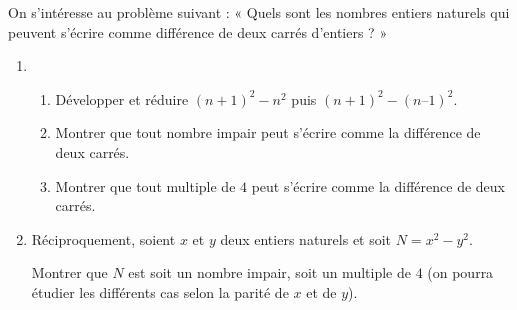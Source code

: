 \documentclass[
	classe=$2^{de}$
]{évaluation}
\begin{document}
\begin{exercice}
	On s’intéresse au problème suivant : « Quels sont les nombres entiers naturels qui peuvent s’écrire comme différence de deux carrés d’entiers ? »
	\begin{enumerate}
		\item \begin{enumerate}
			\item Développer et réduire $(n + 1)^2 - n^2$ puis $(n + 1)^2 - (n – 1)^2$.
			\item Montrer que tout nombre impair peut s’écrire comme la différence de deux carrés.
			\item Montrer que tout multiple de $4$ peut s’écrire comme la différence de deux carrés.
		\end{enumerate}
		\item Réciproquement, soient $x$ et $y$ deux entiers naturels et soit $N = x^2 - y^2$.
		
		Montrer que $N$ est soit un nombre impair, soit un multiple de $4$ (on pourra étudier les différents cas selon la parité de $x$ et de $y$).
	\end{enumerate}
\end{exercice}
\end{document}
